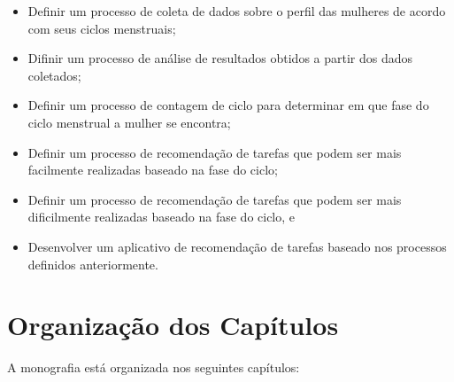 \begin{itemize}

        \item Definir um processo de coleta de dados sobre o perfil das mulheres de acordo com seus ciclos menstruais;
        
        \item Difinir um processo de análise de resultados obtidos a partir dos dados coletados;

        \item Definir um processo de contagem de ciclo para determinar em que fase do ciclo menstrual a mulher se encontra;

        \item Definir um processo de recomendação de tarefas que podem ser  mais facilmente realizadas baseado na fase do ciclo;

        \item Definir um processo de recomendação de tarefas que podem ser mais dificilmente realizadas baseado na fase do ciclo, e

        \item Desenvolver um aplicativo de recomendação de tarefas baseado nos processos definidos anteriormente.

\end{itemize}

\section{Organização dos Capítulos}

A monografia está organizada nos seguintes capítulos:

